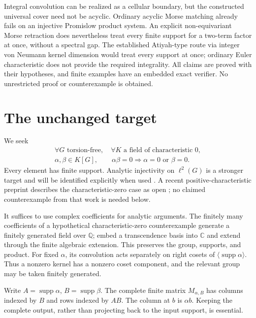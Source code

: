 \documentclass[11pt,a4paper,oneside]{report}
\theoremstyle{definition}
\theoremstyle{remark}
\DeclareMathOperator{\supp}{supp}
\newcommand{\C}{\mathbb C}
\newcommand{\Q}{\mathbb Q}
\begin{document}
Integral convolution can be realized as a cellular boundary, but the
constructed universal cover need not be acyclic. Ordinary acyclic
Morse matching already fails on an injective Promislow product system.
An explicit non-equivariant Morse retraction does nevertheless treat
every finite support for a two-term factor at once, without a spectral gap.
The established Atiyah-type route via integer von Neumann kernel
dimension would treat every support at once; ordinary Euler
characteristic does not provide the required integrality. All claims
are proved with their hypotheses, and finite examples have an embedded
exact verifier. No unrestricted proof or counterexample is obtained.
\medskip
\section{The unchanged target}

We seek
\begin{equation}\label{M07:eq:target}
\begin{gathered}
\forall G\text{ torsion-free},\quad
\forall K\text{ a field of characteristic }0,\\
\alpha,\beta\in K[G],\qquad
\alpha\beta=0\Longrightarrow\alpha=0\text{ or }\beta=0.
\end{gathered}
\end{equation}
Every element has finite support. Analytic injectivity on $\ell^2(G)$
is a stronger target and will be identified explicitly when used
\cite{B:Linnell,B:LR}. A recent positive-characteristic preprint describes
the characteristic-zero case as open \cite{B:Ivanov}; no claimed
counterexample from that work is needed below.

It suffices to use complex coefficients for analytic arguments.
The finitely many coefficients of a hypothetical characteristic-zero
counterexample generate a finitely generated field over $\Q$;
embed a transcendence basis into $\C$ and extend through the finite
algebraic extension. This preserves the group, supports, and product.
For fixed $\alpha$, its convolution acts separately on right cosets
of $\langle\supp\alpha\rangle$. Thus a nonzero kernel has a
nonzero coset component, and the relevant group may be taken
finitely generated.

Write $A=\supp\alpha$, $B=\supp\beta$. The complete finite
matrix $M_{\alpha,B}$ has columns indexed by $B$ and rows indexed
by $AB$. The column at $b$ is $\alpha b$. Keeping the complete
output, rather than projecting back to the input support, is essential.
\end{document}
